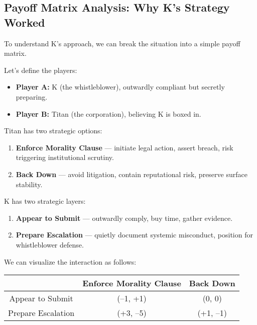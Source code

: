 \subsection{Payoff Matrix Analysis: Why K’s Strategy Worked}

To understand K’s approach, we can break the situation into a simple payoff matrix.

Let’s define the players:

\begin{itemize}
    \item \textbf{Player A:} K (the whistleblower), outwardly compliant but secretly preparing.
    \item \textbf{Player B:} Titan (the corporation), believing K is boxed in.
\end{itemize}

Titan has two strategic options:

\begin{enumerate}
    \item \textbf{Enforce Morality Clause} — initiate legal action, assert breach, risk triggering institutional scrutiny.
    \item \textbf{Back Down} — avoid litigation, contain reputational risk, preserve surface stability.
\end{enumerate}

K has two strategic layers:

\begin{enumerate}
    \item \textbf{Appear to Submit} — outwardly comply, buy time, gather evidence.
    \item \textbf{Prepare Escalation} — quietly document systemic misconduct, position for whistleblower defense.
\end{enumerate}

\medskip

We can visualize the interaction as follows:

\begin{center}
\begin{tabular}{|c|c|c|}
\hline
 & Enforce Morality Clause & Back Down \\
\hline
Appear to Submit & (–1, +1) & (0, 0) \\
\hline
Prepare Escalation & (+3, –5) & (+1, –1) \\
\hline
\end{tabular}
\end{center}

\medskip

